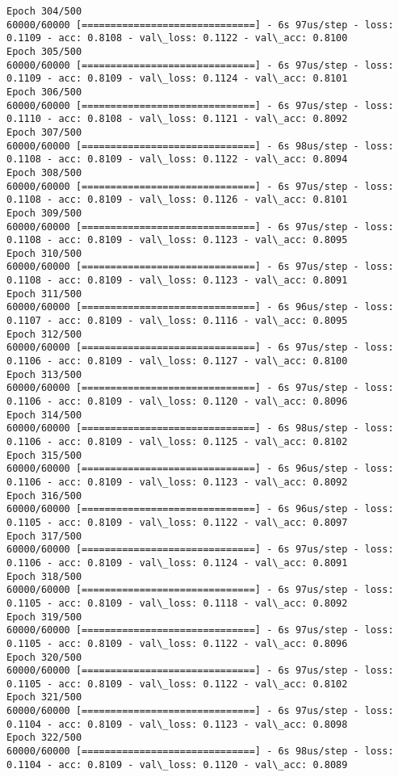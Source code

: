 \documentclass[11pt]{article}
\begin{document}
\begin{Verbatim}[commandchars=\\\{\}]
Epoch 304/500
60000/60000 [==============================] - 6s 97us/step - loss: 0.1109 - acc: 0.8108 - val\_loss: 0.1122 - val\_acc: 0.8100
Epoch 305/500
60000/60000 [==============================] - 6s 97us/step - loss: 0.1109 - acc: 0.8109 - val\_loss: 0.1124 - val\_acc: 0.8101
Epoch 306/500
60000/60000 [==============================] - 6s 97us/step - loss: 0.1110 - acc: 0.8108 - val\_loss: 0.1121 - val\_acc: 0.8092
Epoch 307/500
60000/60000 [==============================] - 6s 98us/step - loss: 0.1108 - acc: 0.8109 - val\_loss: 0.1122 - val\_acc: 0.8094
Epoch 308/500
60000/60000 [==============================] - 6s 97us/step - loss: 0.1108 - acc: 0.8109 - val\_loss: 0.1126 - val\_acc: 0.8101
Epoch 309/500
60000/60000 [==============================] - 6s 97us/step - loss: 0.1108 - acc: 0.8109 - val\_loss: 0.1123 - val\_acc: 0.8095
Epoch 310/500
60000/60000 [==============================] - 6s 97us/step - loss: 0.1108 - acc: 0.8109 - val\_loss: 0.1123 - val\_acc: 0.8091
Epoch 311/500
60000/60000 [==============================] - 6s 96us/step - loss: 0.1107 - acc: 0.8109 - val\_loss: 0.1116 - val\_acc: 0.8095
Epoch 312/500
60000/60000 [==============================] - 6s 97us/step - loss: 0.1106 - acc: 0.8109 - val\_loss: 0.1127 - val\_acc: 0.8100
Epoch 313/500
60000/60000 [==============================] - 6s 97us/step - loss: 0.1106 - acc: 0.8109 - val\_loss: 0.1120 - val\_acc: 0.8096
Epoch 314/500
60000/60000 [==============================] - 6s 98us/step - loss: 0.1106 - acc: 0.8109 - val\_loss: 0.1125 - val\_acc: 0.8102
Epoch 315/500
60000/60000 [==============================] - 6s 96us/step - loss: 0.1106 - acc: 0.8109 - val\_loss: 0.1123 - val\_acc: 0.8092
Epoch 316/500
60000/60000 [==============================] - 6s 96us/step - loss: 0.1105 - acc: 0.8109 - val\_loss: 0.1122 - val\_acc: 0.8097
Epoch 317/500
60000/60000 [==============================] - 6s 97us/step - loss: 0.1106 - acc: 0.8109 - val\_loss: 0.1124 - val\_acc: 0.8091
Epoch 318/500
60000/60000 [==============================] - 6s 97us/step - loss: 0.1105 - acc: 0.8109 - val\_loss: 0.1118 - val\_acc: 0.8092
Epoch 319/500
60000/60000 [==============================] - 6s 97us/step - loss: 0.1105 - acc: 0.8109 - val\_loss: 0.1122 - val\_acc: 0.8096
Epoch 320/500
60000/60000 [==============================] - 6s 97us/step - loss: 0.1105 - acc: 0.8109 - val\_loss: 0.1122 - val\_acc: 0.8102
Epoch 321/500
60000/60000 [==============================] - 6s 97us/step - loss: 0.1104 - acc: 0.8109 - val\_loss: 0.1123 - val\_acc: 0.8098
Epoch 322/500
60000/60000 [==============================] - 6s 98us/step - loss: 0.1104 - acc: 0.8109 - val\_loss: 0.1120 - val\_acc: 0.8089

\end{Verbatim}
\end{document}
